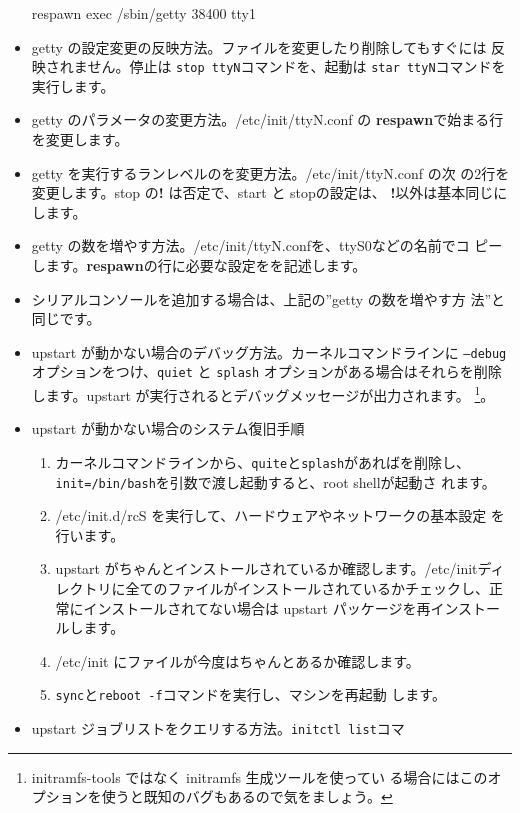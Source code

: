 \documentclass[mingoth,a4paper]{jsarticle}
\begin{document}
\begin{itemize}
\begin{commandline}
respawn
exec /sbin/getty 38400 tty1
\end{commandline}
 \item getty の設定変更の反映方法。ファイルを変更したり削除してもすぐには
       反映されません。停止は \texttt{stop ttyN}コマンドを、起動は
       \texttt{star ttyN}コマンドを実行します。
 \item getty のパラメータの変更方法。/etc/init/ttyN.conf の
       \textbf{respawn}で始まる行を変更します。
 \item getty を実行するランレベルのを変更方法。/etc/init/ttyN.conf の次
       の2行を変更します。stop の\textbf{!} は否定で、start と stopの設定は、
       \textbf{!}以外は基本同じにします。
 \item getty の数を増やす方法。/etc/init/ttyN.confを、ttyS0などの名前でコ
       ピーします。\textbf{respawn}の行に必要な設定をを記述します。
 \item シリアルコンソールを追加する場合は、上記の''getty の数を増やす方
       法''と同じです。
 \item upstart が動かない場合のデバッグ方法。カーネルコマンドラインに
       \texttt{--debug}オプションをつけ、\texttt{quiet} と
       \texttt{splash} オプションがある場合はそれらを削除します。upstart
       が実行されるとデバッグメッセージが出力されます。
       \footnote{initramfs-tools ではなく initramfs 生成ツールを使ってい
       る場合にはこのオプションを使うと既知のバグもあるので気をましょう。}。
 \item upstart が動かない場合のシステム復旧手順
 \begin{enumerate}
  \item カーネルコマンドラインから、\texttt{quite}と\texttt{splash}があればを削除し、
	\texttt{init=/bin/bash}を引数で渡し起動すると、root shellが起動さ
	れます。
  \item /etc/init.d/rcS を実行して、ハードウェアやネットワークの基本設定
	を行います。
  \item upstart がちゃんとインストールされているか確認します。/etc/initディ
	レクトリに全てのファイルがインストールされているかチェックし、正
	常にインストールされてない場合は upstart パッケージを再インストー
	ルします。
  \item /etc/init にファイルが今度はちゃんとあるか確認します。
  \item \texttt{sync}と\texttt{reboot -f}コマンドを実行し、マシンを再起動
	します。
 \end{enumerate}
 \item upstart ジョブリストをクエリする方法。\texttt{initctl list}コマ

\end{itemize}
\end{document}
